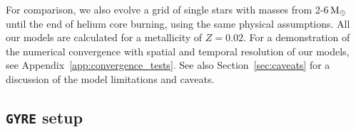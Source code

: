 \documentclass[desactivate]{aa}
\begin{document}
For comparison, we also evolve a grid of single stars with masses from 2-6$\,{\rm M_\odot}$ until the end of helium core burning, using the same physical assumptions. All our models are calculated for a metallicity of $Z = 0.02$.  For a demonstration of the numerical convergence with spatial and temporal resolution of our models, see Appendix~\ref{app:convergence_tests}. See also  Section~\ref{sec:caveats} for a discussion of the model limitations and caveats. 








\subsection{\texttt{GYRE} setup} \label{sec: gyre_setup}
\end{document}

